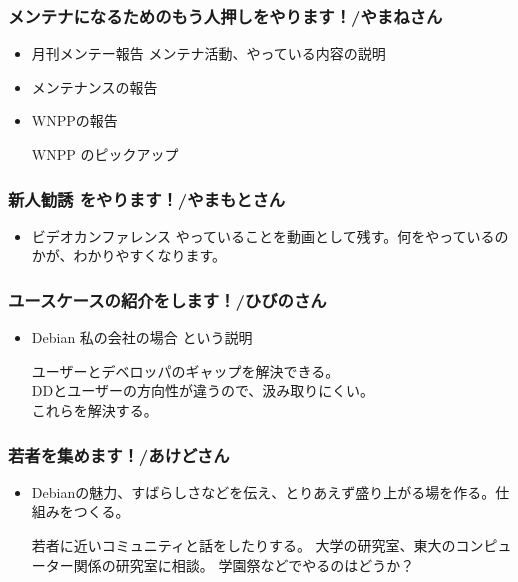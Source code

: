 \documentclass[mingoth,a4paper]{jsarticle}
\begin{document}
\subsubsection{メンテナになるためのもう人押しをやります！/やまねさん}
\begin{itemize}
    \item 月刊メンテー報告
	メンテナ活動、やっている内容の説明

    \item メンテナンスの報告
    \item WNPPの報告

	WNPP のピックアップ
\end{itemize}

\subsubsection{新人勧誘 をやります！/やまもとさん}
\begin{itemize}
    \item ビデオカンファレンス
	やっていることを動画として残す。何をやっているのかが、わかりやすくなります。
\end{itemize}

\subsubsection{ユースケースの紹介をします！/ひびのさん}
\begin{itemize}
    \item Debian 私の会社の場合 という説明

	ユーザーとデベロッパのギャップを解決できる。\\
	DDとユーザーの方向性が違うので、汲み取りにくい。\\
	これらを解決する。\\
\end{itemize}

\subsubsection{若者を集めます！/あけどさん}
\begin{itemize}
    \item Debianの魅力、すばらしさなどを伝え、とりあえず盛り上がる場を作る。仕組みをつくる。
	
	若者に近いコミュニティと話をしたりする。
	大学の研究室、東大のコンピューター関係の研究室に相談。
	学園祭などでやるのはどうか？
\end{itemize}
	
\end{document}
